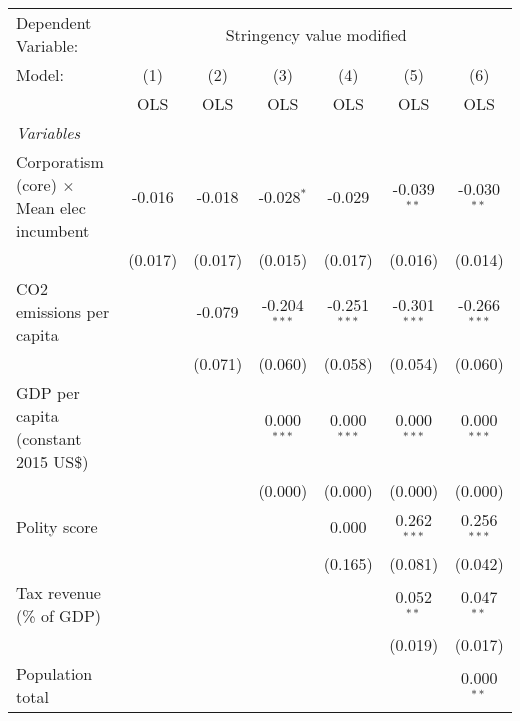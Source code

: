 
\begingroup
\centering
\begin{tabular}{lcccccc}
   \toprule
   Dependent Variable: & \multicolumn{6}{c}{Stringency value modified}\\
   Model:                                           & (1)     & (2)     & (3)            & (4)            & (5)            & (6)\\  
                                                    &  OLS    & OLS     & OLS            & OLS            & OLS            & OLS\\  
   \midrule
   \emph{Variables}\\
   Corporatism (core) $\times$ Mean elec incumbent  & -0.016  & -0.018  & -0.028$^{*}$   & -0.029         & -0.039$^{**}$  & -0.030$^{**}$\\   
                                                    & (0.017) & (0.017) & (0.015)        & (0.017)        & (0.016)        & (0.014)\\   
   CO2 emissions per capita                         &         & -0.079  & -0.204$^{***}$ & -0.251$^{***}$ & -0.301$^{***}$ & -0.266$^{***}$\\   
                                                    &         & (0.071) & (0.060)        & (0.058)        & (0.054)        & (0.060)\\   
   GDP per capita (constant 2015 US\$)              &         &         & 0.000$^{***}$  & 0.000$^{***}$  & 0.000$^{***}$  & 0.000$^{***}$\\   
                                                    &         &         & (0.000)        & (0.000)        & (0.000)        & (0.000)\\   
   Polity score                                     &         &         &                & 0.000          & 0.262$^{***}$  & 0.256$^{***}$\\   
                                                    &         &         &                & (0.165)        & (0.081)        & (0.042)\\   
   Tax revenue (\% of GDP)                          &         &         &                &                & 0.052$^{**}$   & 0.047$^{**}$\\   
                                                    &         &         &                &                & (0.019)        & (0.017)\\   
   Population total                                 &         &         &                &                &                & 0.000$^{**}$\\   

\end{tabular}
